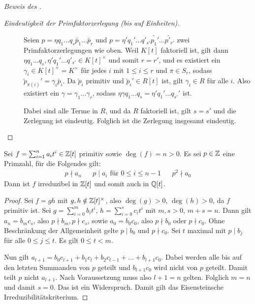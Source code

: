 \documentclass[12pt,a4paper]{scrartcl}
\begin{document}
\begin{proof}[Beweis des ]
\begin{description}
		\item[\emph{Eindeutigkeit der Primfaktorzerlegung (bis auf Einheiten).}] Seien $p = \eta q_1\dots q_s\tilde {p_1}\dots \tilde{p_r}$ und $p = \eta'q_1'\dots q'_{s'}\tilde{p_1'}\dots\tilde{p'_{r'}}$ zwei Primfaktorzerlegungen wie oben.
		Weil $K[t]$ faktoriell ist, gilt dann $\eta q_1\dots q_s,\eta'q_1 '\dots q'_{s'}\in K[t]^{\times}$ und somit $r = r'$, und es existiert ein $\gamma_i\in K[t]^{\times} =K^{\times}$ für jedes $i$ mit $1\leq i \leq r$ und $\pi\in S_r$, sodass $\tilde p_{\pi(i)}' = \gamma_i\tilde{p_i}$. Da $\tilde p_i$ primitiv und $\tilde p_i'\in R[t]$ ist, gilt $\gamma_i\in R$ für alle $i$. Also existiert ein $\gamma = \gamma_1\dots \gamma_r$, sodass $\eta\gamma{q_1}\dots {q_s} = \eta'{q_1'}\dots {q_{s'}'}$ ist.
		
		Dabei sind alle Terme in $R$, und da $R$ faktoriell ist, gilt $s = s'$ und die Zerlegung ist \glqq eindeutig\grqq. Folglich ist die Zerlegung insgesamt \glqq eindeutig\grqq.
  \qedhere
	\end{description}
\end{proof}

\begin{satz} \label{thm:eisenstein}
	Sei $f = \sum_{i = 1}^n a_it^i\in\mathbb Z[t]$ primitiv sowie $\deg (f) = n>0$. Es sei $p\in \mathbb Z$ eine Primzahl, für die Folgendes gilt: \begin{align*}
		p \nmid a_n && \text{$p \mid a_i$ für $0 \le i \le n-1$} && p^2 \nmid a_0 
	\end{align*}
	Dann ist $f$ irreduzibel in $\mathbb Z[t]$ und somit auch in $\mathbb Q[t]$.
\end{satz}

\begin{proof}
	Sei $f = gh$ mit $g, h\notin \mathbb Z[t]^{\times}$, also $\deg(g)>0$, $\deg(h)>0$, da $f$ primitiv ist. Sei $g = \sum_{i = 0}^mb_it^i$, $h = \sum_{i = 0}^sc_it^i$ mit $m,s>0$, $m+s = n$. Dann gilt $a_n = b_mc_s$, also $p\nmid b_m, p\nmid c_s$, sowie $a_0 = b_0c_0$, also $p\nmid b_0$ oder $p\nmid c_0$. Ohne Beschränkung der Allgemeinheit gelte $p\mid b_0$ und $p\nmid c_0$. Sei $t$ maximal mit $p\mid b_j$ für alle $0\leq j\leq t$. Es gilt $0\leq t < m$.
	
	Nun gilt $a_{l+1} = b_0c_{l+1} +b_1c_l +b_2c_{l-1}+\dots +b_{l+1}c_0$. Dabei werden alle bis auf den letzten Summanden von $p$ geteilt und $b_{l+1}c_0$ wird nicht von $p$ geteilt. Damit teilt $p$ nicht $a_{l+1}$. Nach Voraussetzung muss also $l+1 = n$ gelten. Folglich $m = n$ und damit $s = 0$. Das ist ein Widerspruch. Damit gilt das Eisensteinsche Irreduzibilitätskriterium.
\end{proof}
\end{document}
